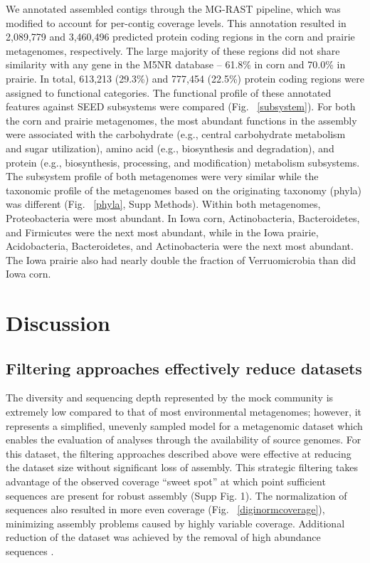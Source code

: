 \documentclass[11pt]{article} %
\begin{document}
We annotated assembled contigs through the MG-RAST pipeline, which
was modified to account for per-contig coverage levels.
This annotation resulted in 2,089,779 and 3,460,496 predicted protein
coding regions in the corn and prairie metagenomes, respectively.  The
large majority of these regions did not share similarity with any gene
in the M5NR database -- 61.8\% in corn and
70.0\% in prairie.  In total, 613,213 (29.3\%) and 777,454 (22.5\%)
protein coding regions were assigned to functional categories.  The
functional profile of these annotated features against SEED subsystems
were compared (Fig. ~\ref{subsystem}).  For both the corn and prairie
metagenomes, the most abundant functions in the assembly were
associated with the carbohydrate (e.g., central carbohydrate
metabolism and sugar utilization), amino acid (e.g., biosynthesis and
degradation), and protein (e.g., biosynthesis, processing, and
modification) metabolism subsystems.  The subsystem profile of both
metagenomes were very similar while the taxonomic profile of the
metagenomes based on the originating taxonomy (phyla) was different
(Fig. ~\ref{phyla}, Supp Methods).  Within both metagenomes,
Proteobacteria were most abundant.  In Iowa
corn, Actinobacteria, Bacteroidetes, and Firmicutes were
the next most abundant, while in the Iowa prairie, Acidobacteria,
Bacteroidetes, and Actinobacteria were the next most abundant.
The Iowa prairie also had nearly double the fraction
of Verruomicrobia than did Iowa corn.


\section{Discussion}

\subsection{Filtering approaches effectively reduce datasets} 

The diversity and sequencing depth represented by the mock community
is extremely low compared to that of most environmental metagenomes;
however, it represents a simplified, unevenly sampled model for a
metagenomic dataset which enables the evaluation of analyses through
the availability of source genomes.  For this dataset, the filtering
approaches described above were effective at reducing the dataset size
without significant loss of assembly.  This strategic filtering takes
advantage of the observed coverage ``sweet spot'' at which point
sufficient sequences are present for robust assembly (Supp Fig. 1).  The normalization of sequences also resulted in
more even coverage (Fig. ~\ref{diginormcoverage}),
minimizing assembly problems caused by highly variable coverage.
Additional reduction of the dataset was achieved by the removal of
high abundance sequences \cite{howeartifacts}.
\end{document}
